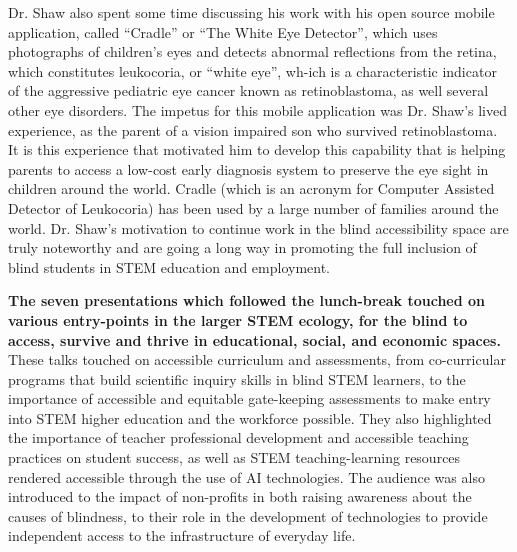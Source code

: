 \documentclass[11.5pt]{sig-alternate}
\begin{document}
\begin{large}
Dr. Shaw also spent some time discussing his work with his open source mobile application, called “Cradle” or “The White Eye Detector”, which uses photographs of children’s eyes and detects abnormal reflections from the retina, which constitutes leukocoria, or “white eye”, wh-ich is a characteristic indicator of the aggressive pediatric eye cancer known as retinoblastoma, as well several other eye disorders. The impetus for this mobile application was Dr. Shaw’s lived experience, as the parent of a vision impaired son who survived retinoblastoma. It is this experience that motivated him to develop this capability that is helping parents to access a low-cost early diagnosis system to preserve the eye sight in children around the world. Cradle (which is an acronym for Computer Assisted Detector of Leukocoria) has been used by a large number of families around the world. Dr. Shaw’s motivation to continue work in the blind accessibility space are truly noteworthy and are going a long way in promoting the full inclusion of blind students in STEM education and employment.

\textbf{The seven presentations which followed the lunch-break touched on various entry-points in the larger STEM ecology, for the blind to access, survive and thrive in educational, social, and economic spaces.} These talks touched on accessible curriculum and assessments, from co-curricular programs that build scientific inquiry skills in blind STEM learners, to the importance of accessible and equitable gate-keeping assessments to make entry into STEM higher education and the workforce possible. They also highlighted the importance of teacher professional development and accessible teaching practices on student success, as well as STEM teaching-learning resources rendered accessible through the use of AI technologies. The audience was also introduced to the impact of non-profits in both raising awareness about the causes of blindness, to their role in the development of technologies to provide independent access to the infrastructure of everyday life.


\end{large}
\end{document}
